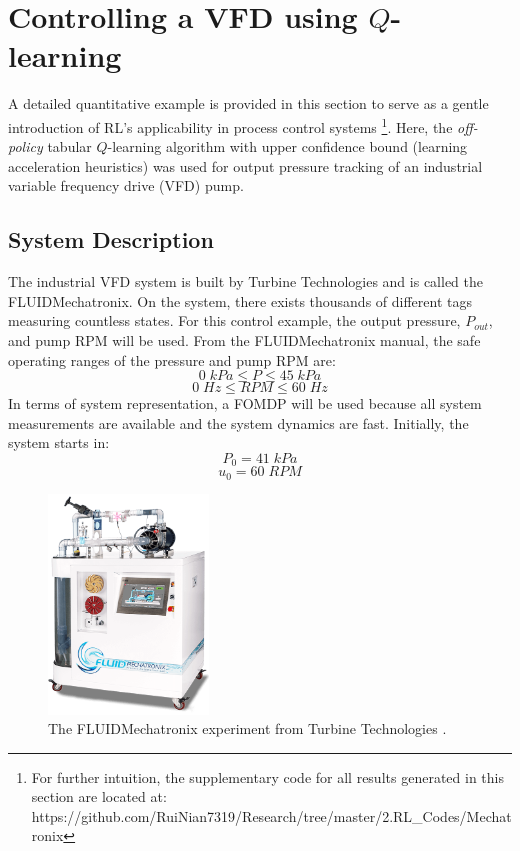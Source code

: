 \section{Controlling a VFD using $Q$-learning}
A detailed quantitative example is provided in this section to serve as a gentle introduction of RL's applicability in process control systems \footnote{For further intuition, the supplementary code for all results generated in this section are located at: https://github.com/RuiNian7319/Research/tree/master/2.RL\_Codes/Mechatronix}. Here, the \textit{off-policy} tabular $Q$-learning algorithm with upper confidence bound (learning acceleration heuristics) was used for output pressure tracking of an industrial variable frequency drive (VFD) pump. 

\subsection{System Description}
The industrial VFD system is built by Turbine Technologies and is called the FLUIDMechatronix.  On the system, there exists thousands of different tags measuring countless states. For this control example, the output pressure, $P_{out}$, and pump RPM will be used. From the FLUIDMechatronix manual, the safe operating ranges of the pressure and pump RPM are:
$$0 \; kPa \leq P  \leq 45 \; kPa$$
$$0 \; Hz \leq RPM  \leq 60 \; Hz$$
In terms of system representation, a FOMDP will be used because all system measurements are available and the system dynamics are fast. Initially, the system starts in:
\begin{equation}
    P_0 = 41 \; kPa
    \label{eq:initial_p}
\end{equation}
\begin{equation}
    u_0 = 60 \; RPM
    \label{eq:initial_u}
\end{equation}

\begin{figure}[H]
    \centering
    \includegraphics[width=0.38\textwidth]{images/ch4/Mechatronix.jpeg}
    \caption{The FLUIDMechatronix experiment from Turbine Technologies \cite{turbine}.}
    \label{fig:mechatronix}
\end{figure}


